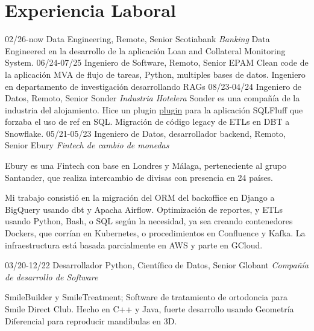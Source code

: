 \section{Experiencia Laboral}

\begin{entrylist}
%
  \entry
    {02/26-now}
    {Data Engineering, Remote, Senior}
    {Scotiabank {\sl Banking}}
    {Data Engineered en la desarrollo de la aplicación Loan and Collateral Monitoring System.}
  \entry
    {06/24-07/25}
    {Ingeniero de Software, Remoto, Senior}
    {EPAM}
    {Clean code de la aplicación MVA de flujo de tareas, Python, multiples bases de datos. Ingeniero en departamento
    de investigación desarrollando RAGs}
  \entry
    {08/23-04/24}
    {Ingeniero de Datos, Remoto, Senior}
    {Sonder {\sl Industria Hotelera}}
        {Sonder es una compañía de la industria del alojamiento. Hice un plugin \href{http:\\https://github.com/juanfejara/sqlfluff-templ-check}{plugin} para la aplicación SQLFluff que forzaba el uso de ref en SQL.
	Migración de código legacy de ETLs en DBT a Snowflake.}
  \entry
    {05/21-05/23}
    {Ingeniero de Datos, desarrollador backend, Remoto, Senior}
    {Ebury {\sl Fintech de cambio de monedas}}
    {Ebury es una Fintech con base en Londres y Málaga, perteneciente al grupo Santander, que realiza intercambio de divisas con presencia en 24 países.

Mi trabajo consistió en la migración del ORM del backoffice en Django a BigQuery usando dbt y Apacha Airflow. Optimización de reportes, y ETLs usando Python, Bash, o SQL según la necesidad, ya sea creando contenedores Dockers, que corrían en Kubernetes, o procedimientos en Confluence y Kafka. La infraestructura está basada parcialmente en AWS y parte en GCloud.}

  \entry
    {03/20-12/22}
    {Desarrollador Python, Científico de Datos, Senior}
    {Globant {\sl Compañía de desarrollo de Software}}
	{SmileBuilder y SmileTreatment; Software de tratamiento de ortodoncia para Smile Direct Club. Hecho en C++ y Java,
fuerte desarrollo usando Geometría Diferencial para reproducir mandíbulas en 3D.

}
\end{entrylist}
